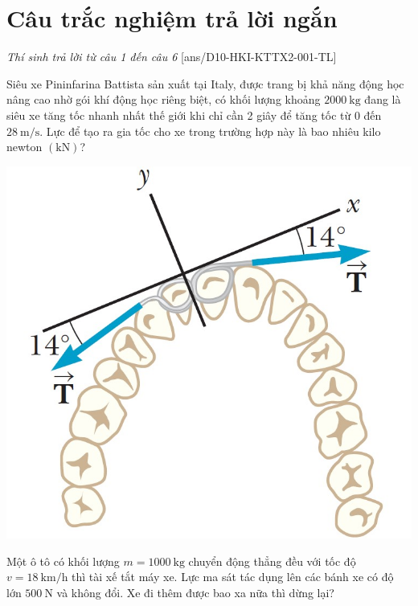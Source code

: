 \section{Câu trắc nghiệm trả lời ngắn} \textit{Thí sinh trả lời từ câu 1 đến câu 6}
\setcounter{ex}{0}
[ans/D10-HKI-KTTX2-001-TL]
\begin{ex}
	Siêu xe Pininfarina Battista sản xuất tại Italy, được trang bị khả năng động học nâng cao nhờ gói khí động học riêng biệt, có khối lượng khoảng $\SI{2000}{\kilogram}$ đang là siêu xe tăng tốc nhanh nhất thế giới khi chỉ cần 2 giây để tăng tốc từ 0 đến $\SI{28}{\meter/\second}$. Lực để tạo ra gia tốc cho xe trong trường hợp này là bao nhiêu kilo newton $\left(\si{\kilo\newton}\right)$?
	\loigiai{
		
	}
\end{ex}
\begin{ex}
	{\includegraphics[width=0.5\linewidth]{../figs/D10-HKI-KTTX2-002-1}}
	\loigiai{
		
	}
\end{ex}
\begin{ex}
	Một ô tô có khối lượng $m=\SI{1000}{\kilogram}$ chuyển động thẳng đều với tốc độ $v=\SI{18}{\kilo\meter/\hour}$ thì tài xế tắt máy xe. Lực ma sát tác dụng lên các bánh xe có độ lớn $\SI{500}{\newton}$ và không đổi. Xe đi thêm được bao xa nữa thì dừng lại?
	\loigiai{
		
	}
\end{ex}
